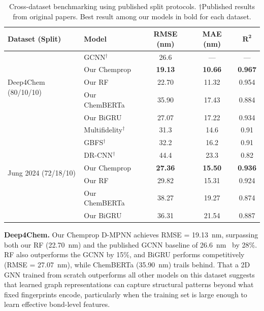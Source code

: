 \documentclass[11pt,a4paper]{article}
\begin{document}
\begin{table}[t]
\centering
\caption{Cross-dataset benchmarking using published split protocols. $\dagger$Published results from original papers. Best result among our models in bold for each dataset.}
\label{tab:cross_dataset}
\begin{tabular}{llccc}
\toprule
\textbf{Dataset (Split)} & \textbf{Model} & \textbf{RMSE (nm)} & \textbf{MAE (nm)} & $\boldsymbol{R^2}$ \\
\midrule
\multirow{5}{*}{Deep4Chem (80/10/10)}
  & GCNN$^\dagger$            & 26.6   & ---    & ---   \\
  & Our Chemprop              & \textbf{19.13}  & \textbf{10.66}  & \textbf{0.967} \\
  & Our RF                    & 22.70  & 11.32  & 0.954 \\
  & Our ChemBERTa             & 35.90  & 17.43  & 0.884 \\
  & Our BiGRU                 & 27.07  & 17.22  & 0.934 \\
\midrule
\multirow{7}{*}{Jung 2024 (72/18/10)}
  & Multifidelity$^\dagger$   & 31.3   & 14.6   & 0.91  \\
  & GBFS$^\dagger$            & 32.2   & 16.2   & 0.91  \\
  & DR-CNN$^\dagger$          & 44.4   & 23.3   & 0.82  \\
  & Our Chemprop              & \textbf{27.36}  & \textbf{15.50}  & \textbf{0.936} \\
  & Our RF                    & 29.82  & 15.31  & 0.924 \\
  & Our ChemBERTa             & 38.27  & 19.27  & 0.874 \\
  & Our BiGRU                 & 36.31  & 21.54  & 0.887 \\
\bottomrule
\end{tabular}
\end{table}

\textbf{Deep4Chem.}
Our Chemprop D-MPNN achieves RMSE = 19.13~nm, surpassing both our RF (22.70~nm) and the published GCNN baseline of 26.6~nm~\cite{joung2021deep} by 28\%.
RF also outperforms the GCNN by 15\%, and BiGRU performs competitively (RMSE = 27.07~nm), while ChemBERTa (35.90~nm) trails behind.
That a 2D GNN trained from scratch outperforms all other models on this dataset suggests that learned graph representations can capture structural patterns beyond what fixed fingerprints encode, particularly when the training set is large enough to learn effective bond-level features.
\end{document}
